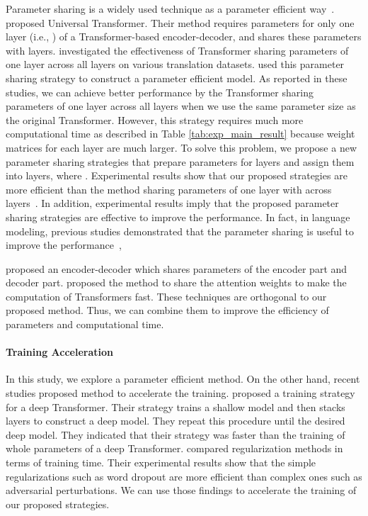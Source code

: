 \documentclass[11pt]{article}
\begin{document}
Parameter sharing is a widely used technique as a parameter efficient way~\cite{dehghani2019,Dabre_Fujita_2019,Xia_He_Tan_Tian_He_Qin_2019,lan2020}.
 proposed Universal Transformer.
Their method requires parameters for only one layer (i.e., ) of a Transformer-based encoder-decoder, and shares these parameters with  layers.
 investigated the effectiveness of Transformer sharing parameters of one layer across all layers on various translation datasets.
 used this parameter sharing strategy to construct a parameter efficient model.
As reported in these studies, we can achieve better performance by the Transformer sharing parameters of one layer across all layers when we use the same parameter size as the original Transformer.
However, this strategy requires much more computational time as described in Table \ref{tab:exp_main_result} because weight matrices for each layer are much larger.
To solve this problem, we propose a new parameter sharing strategies that prepare parameters for  layers and assign them into  layers, where .
Experimental results show that our proposed strategies are more efficient than the method sharing parameters of one layer with across layers~\cite{dehghani2019,Dabre_Fujita_2019,lan2020}.
In addition, experimental results imply that the proposed parameter sharing strategies are effective to improve the performance.
In fact, in language modeling, previous studies demonstrated that the parameter sharing is useful to improve the performance~\cite{DBLP:journals/corr/MelisDB17,merityRegOpt,takase-etal-2018-direct},



 proposed an encoder-decoder which shares parameters of the encoder part and decoder part.
 proposed the method to share the attention weights to make the computation of Transformers fast.
These techniques are orthogonal to our proposed method.
Thus, we can combine them to improve the efficiency of parameters and computational time.


\paragraph{Training Acceleration}
In this study, we explore a parameter efficient method.
On the other hand, recent studies proposed method to accelerate the training.
 proposed a training strategy for a deep Transformer.
Their strategy trains a shallow model and then stacks layers to construct a deep model.
They repeat this procedure until the desired deep model.
They indicated that their strategy was faster than the training of whole parameters of a deep Transformer.
 compared regularization methods in terms of training time.
Their experimental results show that the simple regularizations such as word dropout are more efficient than complex ones such as adversarial perturbations.
We can use those findings to accelerate the training of our proposed strategies.
\end{document}
